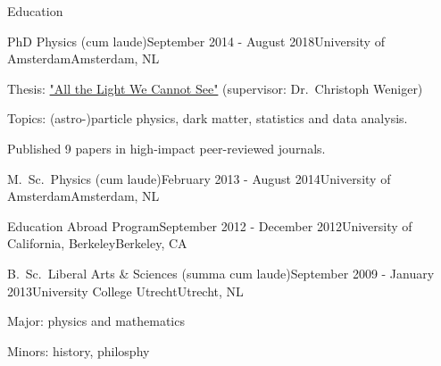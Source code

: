 \documentclass{resume} %
\begin{document}
\begin{rSection}{Education}

\begin{rSubsection}{PhD Physics (cum laude)}{September 2014 - August 2018}{University of Amsterdam}{Amsterdam, NL}
\vspace{-1.5em}
\item Thesis: \href{https://pure.uva.nl/ws/files/28193639/Thesis.pdf}{"All the Light We Cannot See"} (supervisor: Dr.~Christoph Weniger)
\item Topics: (astro-)particle physics, dark matter, statistics and data analysis.
\item Published 9 papers in high-impact peer-reviewed journals.
\end{rSubsection}

\begin{rSubsection}{M.~Sc.~Physics (cum laude)}{February 2013 - August 2014}{University of Amsterdam}{Amsterdam, NL}
\vspace{-1.5em}
\end{rSubsection}

\begin{rSubsection}{Education Abroad Program}{September 2012 - December 2012}{University of California, Berkeley}{Berkeley, CA}
\vspace{-1.5em}
\end{rSubsection}

\begin{rSubsection}{B.~Sc.~Liberal Arts \& Sciences (summa cum laude)}{September 2009 - January 2013}{University College Utrecht}{Utrecht, NL}
\vspace{-1.5em}
 \item Major: physics and mathematics
 \item Minors: history, philosphy
\end{rSubsection}
\end{rSection}

\end{document}
